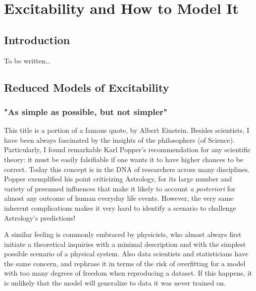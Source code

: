 \chapter{Excitability and How to Model It}
\label{excitab} %



\section{Introduction}\label{sec:1}
To be written\dots


\section{Reduced Models of Excitability}\label{sec:2}

\subsection{"As simple as possible, but not simpler"}
This title is a portion of a famous quote, by Albert Einstein. Besides scientists, I have been always fascinated by the insights of the philosophers (of Science). Particularly, I found remarkable Karl Popper's recommendation for any scientific theory: it must be easily falsifiable if one wants it to have higher chances to be correct. Today this concept is in the DNA of researchers across many disciplines. Popper exemplified his point criticizing Astrology, for its large number and variety of presumed  influences that make it likely to account \textit{a posteriori} for almost any outcome of human everyday life events. However, the very same inherent complications makes it very hard to identify a scenario to challenge Astrology's predictions! 

A similar feeling is commonly embraced by physicists, who almost always first initiate a theoretical inquiries with a minimal description and with the simplest possible scenario of a physical system. Also data scientists and statisticians have the same concern, and rephrase it in terms of the risk of overfitting for a model with too many degrees of freedom when reproducing a dataset. If this happens, it is unlikely that the model will generalize to data it was never trained on.

